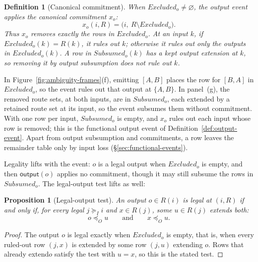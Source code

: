 \documentclass[sigconf]{cidr-2027}
\newtheorem{proposition}{Proposition}
\newtheorem{definition}{Definition}
\theoremstyle{remark}
\newcommand{\OutputOrd}{\preceq_O}
\newcommand{\InputGe}{\succeq_I}
\newcommand{\commitment}{commitment\xspace}
\newcommand{\commitments}{commitments\xspace}
\newcommand{\outrel}{extends\xspace}          %
\newcommand{\outrelbase}{extend\xspace}       %
\newcommand{\outrelpart}{extending\xspace}    %
\newcommand{\outrelpast}{extended\xspace}     %
\newcommand{\outnoun}{output extension\xspace}%
\newcommand{\Subsumed}{\mathit{Subsumed}}
\newcommand{\Excluded}{\mathit{Excluded}}
\begin{document}
\begin{definition}[Canonical \commitment]
\label{def:canonical-commitment}
When $\Excluded_o\neq\varnothing$, the output event applies the \emph{canonical
\commitment} $x_o$:
\begin{equation}
  x_o(i,R)=\bigl(i,\ R\setminus\Excluded_o\bigr).
  \label{eq:canonical-commitment-relational}
\end{equation}
Thus $x_o$ removes exactly the rows in $\Excluded_o$. At an input $k$, if
  $\Excluded_o(k)=R(k)$, it rules out $k$; otherwise it rules out only the
  outputs in $\Excluded_o(k)$. A row in $\Subsumed_o(k)$ has a kept \outnoun
  at $k$, so removing it by output subsumption does not rule out $k$.
\end{definition}

In Figure~\ref{fig:ambiguity-frames}(f), emitting $[A,B]$ places the row for
$[B,A]$ in $\Excluded_o$, so the event rules out that output at $\{A,B\}$. In panel~(g), the removed route sets, at both inputs, are in $\Subsumed_o$,
each \outrelpast by a retained route set at its input, so the event subsumes them without
\commitment. With one row per input, $\Subsumed_o$ is empty, and $x_o$ rules
out each input whose row is removed; this is the functional output event of
Definition~\ref{def:output-event}. Apart from output subsumption and
\commitments, a row leaves the remainder table only by input loss
(\S\ref{sec:functional-events}).

Legality lifts with the event: $o$ is a legal output when $\Excluded_o$ is
empty, and then $\mathsf{output}(o)$ applies no \commitment, though it may
still subsume the rows in $\Subsumed_o$. The legal-output test lifts as well:

\begin{proposition}[Legal-output test]
\label{prop:exposability}
An output $o\in R(i)$ is legal at $(i,R)$ if and only if, for every legal
$j\InputGe i$ and $x\in R(j)$, some $u\in R(j)$ \outrel both:
\begin{equation}
  o\OutputOrd u
  \qquad\text{and}\qquad
  x\OutputOrd u.
  \label{eq:safe-exposure}
\end{equation}
\end{proposition}

\begin{proof}
The output $o$ is legal exactly when $\Excluded_o$ is empty, that is, when
every ruled-out row $(j,x)$ is \outrelpast by some row $(j,u)$ \outrelpart
$o$. Rows that already \outrelbase $o$ satisfy the test with $u=x$, so this
is the stated test.
\end{proof}
\end{document}
